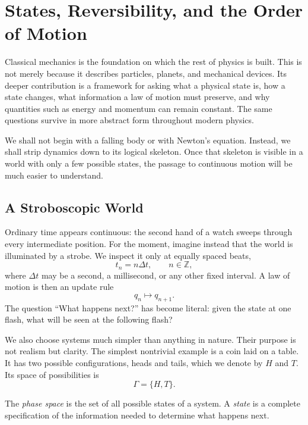 \chapter{States, Reversibility, and the Order of Motion}

Classical mechanics is the foundation on which the rest of physics is built. This is not merely because it describes particles, planets, and mechanical devices. Its deeper contribution is a framework for asking what a physical state is, how a state changes, what information a law of motion must preserve, and why quantities such as energy and momentum can remain constant. The same questions survive in more abstract form throughout modern physics.

We shall not begin with a falling body or with Newton's equation. Instead, we shall strip dynamics down to its logical skeleton. Once that skeleton is visible in a world with only a few possible states, the passage to continuous motion will be much easier to understand.

\section{A Stroboscopic World}

Ordinary time appears continuous: the second hand of a watch sweeps through every intermediate position. For the moment, imagine instead that the world is illuminated by a strobe. We inspect it only at equally spaced beats,
\begin{equation}
 t_n=n\Delta t,
 \qquad n\in\mathbb Z,
\end{equation}
where \(\Delta t\) may be a second, a millisecond, or any other fixed interval. A law of motion is then an update rule
\begin{equation}
 q_n\longmapsto q_{n+1}.
\end{equation}
The question ``What happens next?'' has become literal: given the state at one flash, what will be seen at the following flash?

We also choose systems much simpler than anything in nature. Their purpose is not realism but clarity. The simplest nontrivial example is a coin laid on a table. It has two possible configurations, heads and tails, which we denote by \(H\) and \(T\). Its space of possibilities is
\begin{equation}
 \Gamma=\{H,T\}.
\end{equation}

\begin{definition}
The \emph{phase space} is the set of all possible states of a system. A \emph{state} is a complete specification of the information needed to determine what happens next.
\end{definition}

